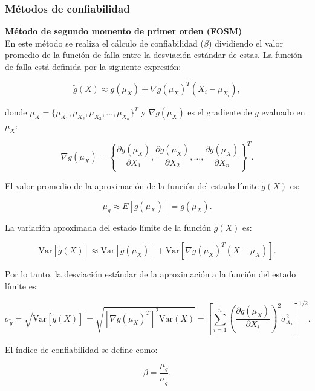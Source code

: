 \subsubsection{Métodos de confiabilidad}
\textbf{Método de segundo momento de primer orden (FOSM)}\\
En este método se realiza el cálculo de confiabilidad (\(\beta\)) dividiendo el valor promedio de la función de falla entre la desviación estándar de estas. La función de falla está definida por la siguiente expresión:

\begin{equation}
\tilde{g}(X) \approx g(\mu_X) + \nabla g(\mu_X)^T (X_i - \mu_{X_i}),
\end{equation}

donde \(\mu_X = \{\mu_{X_1}, \mu_{X_2}, \mu_{X_3}, \dots, \mu_{X_n}\}^T\) y \(\nabla g(\mu_X)\) es el gradiente de \(g\) evaluado en \(\mu_X\):

\begin{equation}
\nabla g(\mu_X) = \left\{ \frac{\partial g(\mu_X)}{\partial X_1}, \frac{\partial g(\mu_X)}{\partial X_2}, \dots, \frac{\partial g(\mu_X)}{\partial X_n} \right\}^T.
\end{equation}

El valor promedio de la aproximación de la función del estado límite \(\tilde{g}(X)\) es:

\begin{equation}
\mu_{\tilde{g}} \approx E[g(\mu_X)] = g(\mu_X).
\end{equation}

La variación aproximada del estado límite de la función \(\tilde{g}(X)\) es:

\begin{equation}
\text{Var}[\tilde{g}(X)] \approx \text{Var}[g(\mu_X)] + \text{Var}[\nabla g(\mu_X)^T (X - \mu_X)].
\end{equation}

Por lo tanto, la desviación estándar de la aproximación a la función del estado límite es:

\begin{equation}
\sigma_{\tilde{g}} = \sqrt{\text{Var}[\tilde{g}(X)]} = \sqrt{[\nabla g(\mu_X)^T]^2 \text{Var}(X)} = \left[\sum_{i=1}^{n} \left(\frac{\partial g(\mu_X)}{\partial X_i}\right)^2 \sigma_{X_i}^2 \right]^{1/2}.
\end{equation}

El índice de confiabilidad se define como:

\begin{equation}
\beta = \frac{\mu_{\tilde{g}}}{\sigma_{\tilde{g}}}.
\end{equation}

